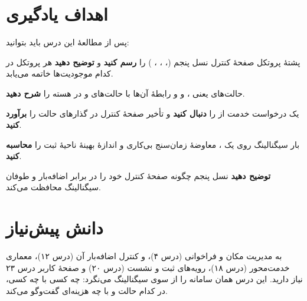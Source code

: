 \documentclass[11pt,a4paper]{article}
\begin{document}
\ACNcover

\section{اهداف یادگیری}
پس از مطالعهٔ این درس باید بتوانید:
\begin{objectives}
  \item پشتهٔ پروتکل صفحهٔ کنترل نسل پنجم (، ، ، ) را \textbf{رسم کنید} و \textbf{توضیح دهید} هر پروتکل در کدام
        موجودیت‌ها خاتمه می‌یابد.
  \item حالت‌های  یعنی ،  و  و رابطهٔ آن‌ها با حالت‌های  و  در هسته را \textbf{شرح دهید}.
  \item یک درخواست خدمت از  را \textbf{دنبال کنید} و تأخیر صفحهٔ کنترل در گذارهای حالت را \textbf{برآورد کنید}.
  \item بار سیگنالینگ روی یک ، معاوضهٔ زمان‌سنج بی‌کاری و اندازهٔ بهینهٔ ناحیهٔ ثبت را \textbf{محاسبه کنید}.
  \item \textbf{توضیح دهید} نسل پنجم چگونه صفحهٔ کنترل خود را در برابر اضافه‌بار و طوفان سیگنالینگ محافظت می‌کند.
\end{objectives}

\section{دانش پیش‌نیاز}
به مدیریت مکان و فراخوانی (درس ۴)،  و کنترل اضافه‌بار آن (درس ۱۲)، معماری خدمت‌محور (درس ۱۸)، رویه‌های ثبت و نشست  (درس
۲۰) و صفحهٔ کاربر درس ۲۳ نیاز دارید. این درس همان سامانه را از سوی سیگنالینگ می‌نگرد: چه کسی با چه کسی، در کدام حالت و با چه هزینه‌ای
گفت‌وگو می‌کند.
\end{document}
